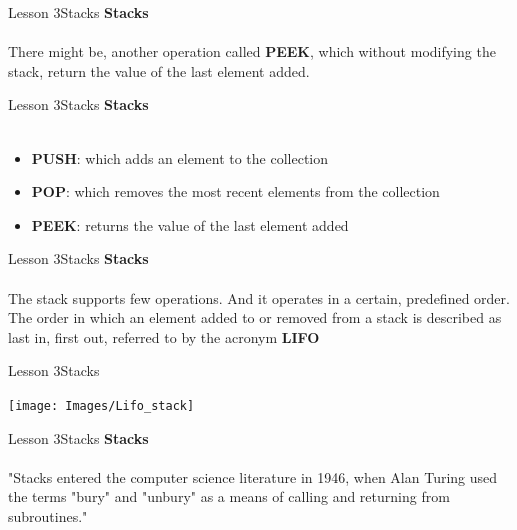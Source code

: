 \documentclass[aspectratio=1610]{beamer}
\begin{document}
\begin{frame}{Lesson 3}{Stacks}
\LARGE
\textbf{Stacks}\\~\\
There might be, another operation called \textbf{PEEK}, which without
modifying the stack, return the value of the last element added.
\end{frame}


\begin{frame}{Lesson 3}{Stacks}
\LARGE
\textbf{Stacks}\\~\\
\begin{itemize}
    \item \textbf{PUSH}: which adds an element to the collection 
    \item \textbf{POP}: which removes the most recent elements from the collection
    \item \textbf{PEEK}: returns the value of the last element added
\end{itemize}
\end{frame}


\begin{frame}{Lesson 3}{Stacks}
\LARGE
\textbf{Stacks}\\~\\
The stack supports few operations. And it operates in a certain,
predefined order. The order in which an element added to or removed
from a stack is described as last in, first out,
referred to by the acronym \textbf{LIFO}
\end{frame}


\begin{frame}{Lesson 3}{Stacks}
\begin{center}
\texttt{[image: Images/Lifo\_stack]}
\end{center}
\end{frame}


\begin{frame}{Lesson 3}{Stacks}
\LARGE
\textbf{Stacks}\\~\\
"Stacks entered the computer science literature in 1946, when
\alert{Alan Turing} used the terms "bury" and "unbury" as a means of
calling and returning from subroutines."
\end{frame}
\end{document}
